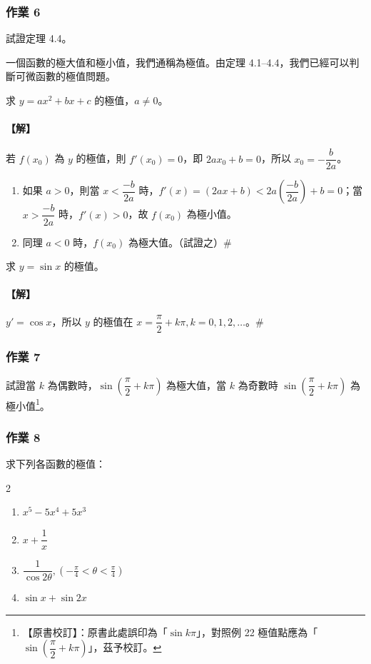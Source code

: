 \subsubsection*{作業 6}
試證定理 4.4。

一個函數的極大值和極小值，我們通稱為極值。由定理 4.1--4.4，我們已經可以判斷可微函數的極值問題。

\begin{example}\label{ex:b6s-app4-21}
求 $y=ax^2+bx+c$ 的極值，$a\ne 0$。
\end{example}

\paragraph{【解】}
若 $f(x_0)$ 為 $y$ 的極值，則 $f'(x_0)=0$，即 $2ax_0+b=0$，所以 $x_0 = -\dfrac{b}{2a}$。
\begin{enumerate}[label=\roman*), leftmargin=2em]
  \item 如果 $a>0$，則當 $x<\dfrac{-b}{2a}$ 時，$f'(x)=(2ax+b)<2a\left(\dfrac{-b}{2a}\right)+b=0$；當 $x>\dfrac{-b}{2a}$ 時，$f'(x)>0$，故 $f(x_0)$ 為極小值。
  \item 同理 $a<0$ 時，$f(x_0)$ 為極大值。（試證之）\hfill$\#$
\end{enumerate}

\begin{example}\label{ex:b6s-app4-22}
求 $y=\sin x$ 的極值。
\end{example}

\paragraph{【解】}
$y'=\cos x$，所以 $y$ 的極值在 $x = \dfrac{\pi}{2}+k\pi, k=0, 1, 2, \dots$。\hfill$\#$

\subsubsection*{作業 7}
試證當 $k$ 為偶數時，$\sin\left(\dfrac{\pi}{2}+k\pi\right)$ 為極大值，當 $k$ 為奇數時 $\sin\left(\dfrac{\pi}{2}+k\pi\right)$ 為極小值\label{note:b6s-app4-p205-sin}\footnote{【原書校訂】：原書此處誤印為「$\sin k\pi$」，對照例 22 極值點應為「$\sin\left(\dfrac{\pi}{2}+k\pi\right)$」，茲予校訂。}。

\subsubsection*{作業 8}
求下列各函數的極值：
\begin{multicols}{2}
\begin{enumerate}[label=\roman*)]
  \item $x^5 - 5x^4 + 5x^3$
  \item $x + \dfrac{1}{x}$
  \item $\dfrac{1}{\cos 2\theta}, \left(-\frac{\pi}{4}<\theta<\frac{\pi}{4}\right)$
  \item $\sin x + \sin 2x$
\end{enumerate}
\end{multicols}

